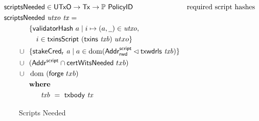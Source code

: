 \begin{figure}[htb]
  \begin{align*}
    & \hspace{-1cm}\fun{scriptsNeeded} \in \UTxO \to \Tx \to
      \powerset{\PolicyID}
    & \text{required script hashes} \\
    &  \hspace{-1cm}\fun{scriptsNeeded}~\var{utxo}~\var{tx} = \\
    & ~~\{ \fun{validatorHash}~a \mid i \mapsto (a, \wcard) \in \var{utxo},\\
    & ~~~~~i\in\fun{txinsScript}~{(\fun{txins~\var{txb}})}~{utxo}\} \\
    \cup & ~~\{ \fun{stakeCred_{r}}~\var{a} \mid a \in \dom (\AddrRWDScr
           \restrictdom \fun{txwdrls}~\var{txb}) \} \\
      \cup & ~~(\AddrScr \cap \fun{certWitsNeeded}~{txb}) \\
      \cup & ~~\dom~(\fun{forge}~{txb}) \\
      & \where \\
      & ~~~~~~~ \var{txb}~=~\txbody{tx} \\
  \end{align*}
  \caption{Scripts Needed}
  \label{fig:functions-witnesses}
\end{figure}



\clearpage
